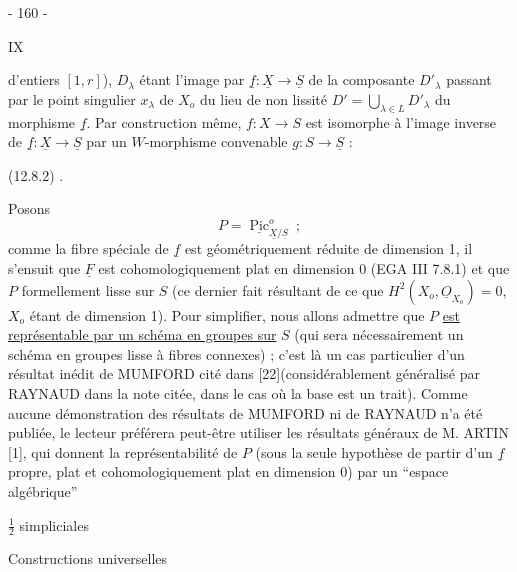 \begin{center}- 160 -\end{center}\hfill IX

d'entiers $[1,r]$), $D_\lambda$ étant l'image par $\underline f:\underline X\longrightarrow\underline S$ de la composante $D'_\lambda$ passant par le point singulier $x_\lambda$ de $X_o$ du lieu de non lissité $D'=\bigcup_{\lambda\in L}D'_\lambda$ du morphisme $\underline f$. Par construction même, $f:X\longrightarrow S$ est isomorphe à l'image inverse de $\underline f:\underline X\longrightarrow\underline S$ par un $W$-morphisme convenable $g:S\longrightarrow\underline S$ :

(12.8.2)
.

Posons
\[\tag{12.8.3} P=\underline{\operatorname{Pic}}^o_{\underline X/\underline S}\ ;\]
comme la fibre spéciale de $\underline f$ est géométriquement réduite de dimension 1, il s'ensuit que $\underline F$ est cohomologiquement plat en dimension 0 (EGA III 7.8.1) et que $P$ formellement lisse sur $S$ (ce dernier fait résultant de ce que $H^2(X_o,\underline O_{X_o})=0$, $X_o$ étant de dimension 1). Pour simplifier, nous allons admettre que $P$ \uline{est représentable par un schéma en groupes sur} $S$ (qui sera nécessairement un schéma en groupes lisse à fibres connexes) ; c'est là un cas particulier d'un résultat inédit de MUMFORD cité dans [22](considérablement généralisé par RAYNAUD dans la note citée, dans le cas où la base est un trait). Comme aucune démonstration des résultats de MUMFORD ni de RAYNAUD n'a été publiée, le lecteur préférera peut-être utiliser les résultats généraux de M. ARTIN [1], qui donnent la représentabilité de $P$ (sous la seule hypothèse de partir d'un $\underline f$ propre, plat et cohomologiquement plat en dimension 0) par un ``espace algébrique''


\begin{flushright}
 $\tfrac12$ simpliciales

Constructions universelles
\end{flushright}

